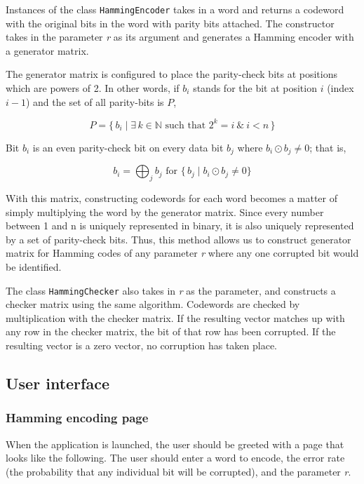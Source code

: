 \documentclass[11pt, oneside]{article}   	%
\begin{document}
Instances of the class \verb|HammingEncoder| takes in a word and returns a codeword with the original bits in the word with parity bits attached. The constructor takes in the parameter \textit{r} as its argument and generates a Hamming encoder with a generator matrix.

The generator matrix is configured to place the parity-check bits at positions which are powers of 2. In other words, if $b_i$ stands for the bit at position $i$ (index $i-1$) and the set of all parity-bits is $P$, 

$$
P = \{\,b_i \mid \exists \, k \in \mathbb{N} \text{ such that } 2^k = i \ \& \ i < n \, \}
$$

Bit $b_i$ is an even parity-check bit on every data bit $b_j$ where $b_i \odot b_j \neq 0$; that is, 

$$
b_i = \bigoplus_{j}b_j \text{ for } \{\,b_j \mid b_i \odot b_j \neq 0\} 
$$

With this matrix, constructing codewords for each word becomes a matter of simply multiplying the word by the generator matrix. Since every number between 1 and n is uniquely represented in binary, it is also uniquely represented by a set of parity-check bits. Thus, this method allows us to construct generator matrix for Hamming codes of any parameter \textit{r} where any one corrupted bit would be identified.

The class \verb!HammingChecker! also takes in \textit{r} as the parameter, and constructs a checker matrix using the same algorithm. Codewords are checked by multiplication with the checker matrix. If the resulting vector matches up with any row in the checker matrix, the bit of that row has been corrupted. If the resulting vector is a zero vector, no corruption has taken place. 

\subsection*{User interface}

\subsubsection*{Hamming encoding page}

When the application is launched, the user should be greeted with a page that looks like the following. The user should enter a word to encode, the error rate (the probability that any individual bit will be corrupted), and the parameter \textit{r}. 
\end{document}
